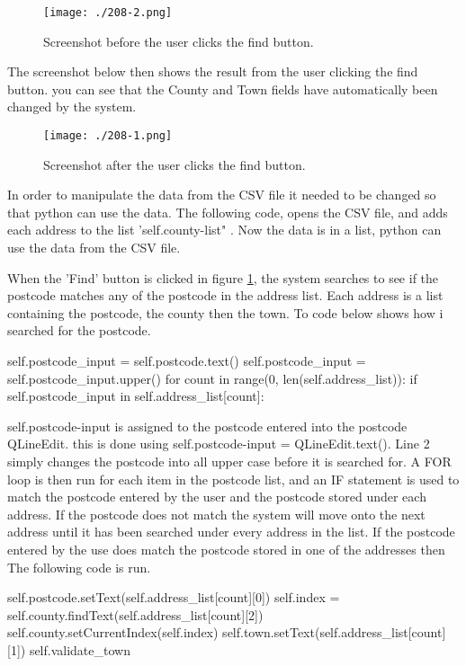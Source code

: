 \begin{figure}[H]
\caption{Screenshot before the user clicks the find button.} \label{fig:find-postcode}
\texttt{[image: ./208-2.png]}
\end{figure}

The screenshot below then shows the result from the user clicking the find button. you can see that the County and Town fields have automatically been changed by the system.

\begin{figure}[H]
\caption{Screenshot after the user clicks the find button.} \label{fig:found-postcode}
\texttt{[image: ./208-1.png]}
\end{figure}

In order to manipulate the data from the CSV file it needed to be changed so that python can use the data. The following code, opens the CSV file, and adds each address to the list 'self.county-list" . Now the data is in a list, python can use the data from the CSV file. 

When the 'Find' button is clicked in figure \ref{fig:find-postcode}, the system searches to see if the postcode matches any of the postcode in the address list. Each address is a list containing the postcode, the county then the town. To code below shows how i searched for the postcode.

\begin{python}
self.postcode_input = self.postcode.text()
self.postcode_input = self.postcode_input.upper()
for count in range(0, len(self.address_list)):
	if self.postcode_input in self.address_list[count]:
\end{python}

self.postcode-input is assigned to the postcode entered into the postcode QLineEdit. this is done using self.postcode-input = QLineEdit.text(). Line 2 simply changes the postcode into all upper case before it is searched for. A FOR loop is then run for each item in the postcode list, and an IF statement is used to match the postcode entered by the user and the postcode stored under each address. If the postcode does not match the system will move onto the next address until it has been searched under every address in the list. If the postcode entered by the use does match the postcode stored in one of the addresses then The following code is run.

\begin{python}
self.postcode.setText(self.address_list[count][0])
self.index = self.county.findText(self.address_list[count][2])
self.county.setCurrentIndex(self.index)
self.town.setText(self.address_list[count][1])
self.validate_town
\end{python}

